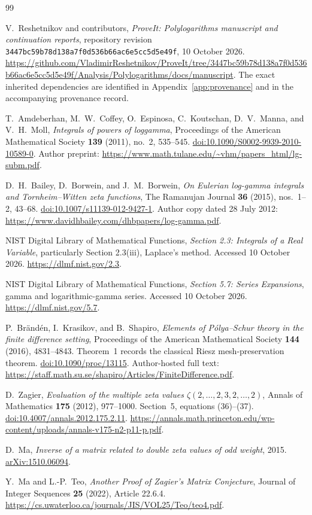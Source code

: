 \documentclass[11pt,letterpaper]{article}
\theoremstyle{definition}
\theoremstyle{remark}
\newcommand{\sourcecommit}{\texttt{3447bc59b78d138a7f0d536b66ac6e5cc5d5e49f}}
\begin{document}
\begin{thebibliography}{99}

V.~Reshetnikov and contributors,
\emph{ProveIt: Polylogarithms manuscript and continuation reports},
repository revision \sourcecommit, 10 October 2026.
\url{https://github.com/VladimirReshetnikov/ProveIt/tree/3447bc59b78d138a7f0d536b66ac6e5cc5d5e49f/Analysis/Polylogarithms/docs/manuscript}.
The exact inherited dependencies are identified in Appendix~\ref{app:provenance}
and in the accompanying provenance record.

T.~Amdeberhan, M.~W.~Coffey, O.~Espinosa, C.~Koutschan,
D.~V.~Manna, and V.~H.~Moll,
\emph{Integrals of powers of loggamma},
Proceedings of the American Mathematical Society \textbf{139} (2011),
no.~2, 535--545.
\href{https://doi.org/10.1090/S0002-9939-2010-10589-0}{doi:10.1090/S0002-9939-2010-10589-0}.
Author preprint:
\url{https://www.math.tulane.edu/~vhm/papers_html/lg-subm.pdf}.

D.~H.~Bailey, D.~Borwein, and J.~M.~Borwein,
\emph{On Eulerian log-gamma integrals and Tornheim--Witten zeta functions},
The Ramanujan Journal \textbf{36} (2015), nos.~1--2, 43--68.
\href{https://doi.org/10.1007/s11139-012-9427-1}{doi:10.1007/s11139-012-9427-1}.
Author copy dated 28 July 2012:
\url{https://www.davidhbailey.com/dhbpapers/log-gamma.pdf}.

NIST Digital Library of Mathematical Functions,
\emph{Section 2.3: Integrals of a Real Variable}, particularly
Section 2.3(iii), Laplace's method. Accessed 10 October 2026.
\url{https://dlmf.nist.gov/2.3}.

NIST Digital Library of Mathematical Functions,
\emph{Section 5.7: Series Expansions}, gamma and logarithmic-gamma
series. Accessed 10 October 2026.
\url{https://dlmf.nist.gov/5.7}.

P.~Br\"and\'en, I.~Krasikov, and B.~Shapiro,
\emph{Elements of P\'olya--Schur theory in the finite difference setting},
Proceedings of the American Mathematical Society \textbf{144} (2016),
4831--4843. Theorem~1 records the classical Riesz mesh-preservation theorem.
\href{https://doi.org/10.1090/proc/13115}{doi:10.1090/proc/13115}.
Author-hosted full text:
\url{https://staff.math.su.se/shapiro/Articles/FiniteDifference.pdf}.

D.~Zagier,
\emph{Evaluation of the multiple zeta values
$\zeta(2,\ldots,2,3,2,\ldots,2)$},
Annals of Mathematics \textbf{175} (2012), 977--1000.
Section~5, equations (36)--(37).
\href{https://doi.org/10.4007/annals.2012.175.2.11}{doi:10.4007/annals.2012.175.2.11}.
\url{https://annals.math.princeton.edu/wp-content/uploads/annals-v175-n2-p11-p.pdf}.

D.~Ma,
\emph{Inverse of a matrix related to double zeta values of odd weight},
2015. \href{https://arxiv.org/abs/1510.06094}{arXiv:1510.06094}.

Y.~Ma and L.-P.~Teo,
\emph{Another Proof of Zagier's Matrix Conjecture},
Journal of Integer Sequences \textbf{25} (2022), Article 22.6.4.
\url{https://cs.uwaterloo.ca/journals/JIS/VOL25/Teo/teo4.pdf}.

\end{thebibliography}
\end{document}
